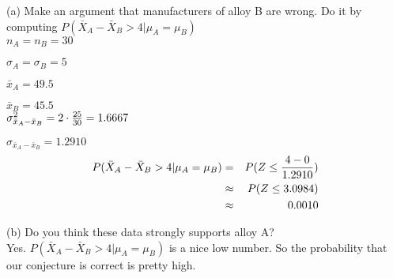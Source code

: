 (a) Make an argument that manufacturers of alloy B
are wrong. Do it by computing $P(\bar{X}_A - \bar{X}_B > 4 | \mu_A = \mu_B)$ \\

$n_A = n_B = 30$

$\sigma_A = \sigma_B = 5$ 

$\bar{x}_A = 49.5$

$\bar{x}_B = 45.5$ \\

$\sigma^2_{\bar{x}_A - \bar{x}_B} = 2 \cdot \frac{25}{30} = 1.6667$


$\sigma_{\bar{x}_A - \bar{x}_B} = 1.2910$ \\
\begin{eqnarray*}
P(\bar{X}_A - \bar{X}_B > 4 | \mu_A = \mu_B) & = & 
P(Z \leq \frac{4-0}{1.2910}) \\
& \approx & P(Z \leq 3.0984) \\
& \approx & 0.0010 \\
\end{eqnarray*}

(b) Do you think these data strongly supports alloy A? \\

Yes. $P(\bar{X}_A - \bar{X}_B > 4 | \mu_A = \mu_B)$ is a nice low number. So the probability that our conjecture is correct is pretty high. 

